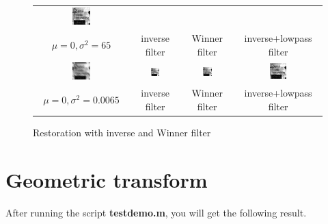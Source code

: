 \documentclass[11pt,a4paper]{article}
\begin{document}
\begin{figure}[!htbp]
\begin{tabular}{cccc}
		\includegraphics[width=0.2\textwidth]{pro5/5_29_e+}\\
		$\mu=0,\sigma^2=65$ &  inverse filter &  Winner filter & inverse+lowpass filter\\
		\includegraphics[width=0.2\textwidth]{pro5/5_29_g}&
		\includegraphics[width=0.2\textwidth]{pro5/5_29_h}&
		\includegraphics[width=0.2\textwidth]{pro5/5_29_i}&
		\includegraphics[width=0.2\textwidth]{pro5/5_29_h+}\\
		$\mu=0,\sigma^2=0.0065$ &  inverse filter &  Winner filter & inverse+lowpass filter\\
	\end{tabular}
	\caption{Restoration with inverse and Winner filter}
	\label{pro5_fig2}
\end{figure}

\section{Geometric transform}
After running the script \textbf{testdemo.m}, you will get the following result.
\end{document}
